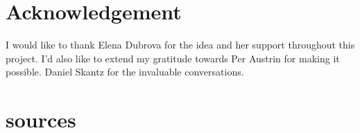 \documentclass[conference]{IEEEtran}
\begin{document}
\section*{Acknowledgement}

I would like to thank Elena Dubrova for the idea and her support throughout this project. I'd also like to extend my gratitude towards Per Austrin for making it possible. Daniel Skantz for the invaluable conversations.

\section{sources}

\nocite{*}
\end{document}
